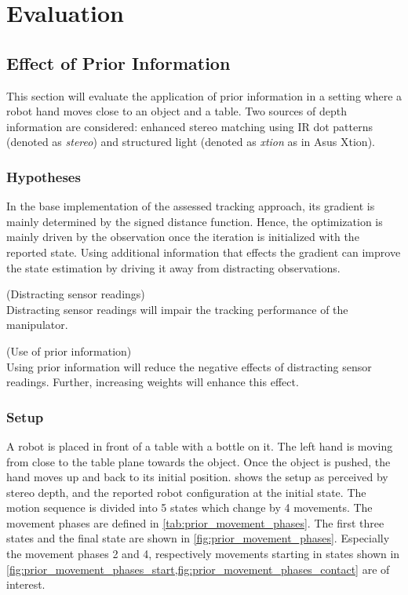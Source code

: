\chapter{Evaluation}
\label{sec:evaluation}

\section{Effect of Prior Information}

This section will evaluate the application of prior information in a setting where a robot hand moves close to an object and a table. Two sources of depth information are considered: enhanced stereo matching using IR dot patterns (denoted as \emph{stereo}) and structured light (denoted as \emph{xtion} as in Asus Xtion).

\subsection{Hypotheses}

In the base implementation of the assessed tracking approach, its gradient is mainly determined by the signed distance function. Hence, the optimization is mainly driven by the observation once the iteration is initialized with the reported state. Using additional information that effects the gradient can improve the state estimation by driving it away from distracting observations.

\begin{hypothesis}(Distracting sensor readings)\\
Distracting sensor readings will impair the tracking performance of the manipulator.
\label{hyp:distracting_readings}
\end{hypothesis}

\begin{hypothesis}(Use of prior information)\\
Using prior information will reduce the negative effects of distracting sensor readings. Further, increasing weights will enhance this effect.
\label{hyp:prior_information}
\end{hypothesis}


\subsection{Setup}

A robot is placed in front of a table with a bottle on it. The left hand is moving from close to the table plane towards the object. Once the object is pushed, the hand moves up and back to its initial position.
 shows the setup as perceived by stereo depth, and the reported robot configuration at the initial state.
The motion sequence is divided into 5 states which change by 4 movements. The movement phases are defined in \cref{tab:prior_movement_phases}. The first three states and the final state are shown in \cref{fig:prior_movement_phases}.
Especially the movement phases 2 and 4, respectively movements starting in states shown in \cref{fig:prior_movement_phases_start,fig:prior_movement_phases_contact} are of interest.

